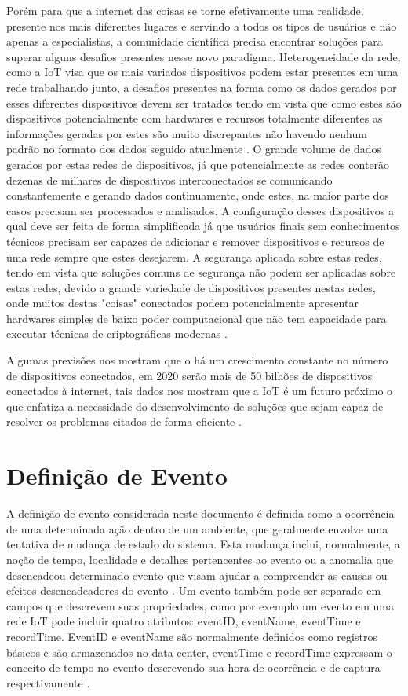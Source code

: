 \documentclass[ti,table]{texufpel} %
\begin{document}
Porém para que a internet das coisas se torne efetivamente uma realidade, presente nos mais diferentes lugares e servindo a todos os tipos de usuários e não apenas a especialistas, a comunidade científica precisa encontrar soluções para superar alguns desafios presentes nesse novo paradigma. Heterogeneidade da rede, como a IoT visa que os mais variados dispositivos podem estar presentes em uma rede trabalhando junto, a desafios presentes na forma como os dados gerados por esses diferentes dispositivos devem ser tratados tendo em vista que como estes são dispositivos potencialmente com hardwares e recursos totalmente diferentes as informações geradas por estes são muito discrepantes não havendo nenhum padrão no formato dos dados seguido atualmente \cite{agrawal2013survey}. O grande volume de dados gerados por estas redes de dispositivos, já que potencialmente as redes conterão dezenas de milhares de dispositivos interconectados se comunicando constantemente e gerando dados continuamente, onde estes, na maior parte dos casos precisam ser processados e analisados. A configuração desses dispositivos a qual deve ser feita de forma simplificada já que usuários finais sem conhecimentos técnicos precisam ser capazes de adicionar e remover dispositivos e recursos de uma rede sempre que estes desejarem. A segurança aplicada sobre estas redes, tendo em vista que soluções comuns de segurança não podem ser aplicadas sobre estas redes,  devido a grande variedade de dispositivos presentes nestas redes, onde muitos destas "coisas" conectados podem potencialmente apresentar hardwares simples de baixo poder computacional que não tem capacidade para executar técnicas de criptográficas modernas \cite{agrawal2013survey}.


Algumas previsões nos mostram que o há um crescimento constante no número de dispositivos conectados, em 2020 serão mais de 50 bilhões de dispositivos conectados à internet, tais dados nos mostram que a IoT é um futuro próximo o que enfatiza a necessidade do desenvolvimento de soluções que sejam capaz de resolver os problemas citados de forma eficiente \cite{xavier2016smart}.

\section{Definição de Evento}
A definição de evento considerada neste documento é definida como a ocorrência de uma determinada ação dentro de um ambiente, que geralmente envolve uma tentativa de mudança de estado do sistema. Esta mudança inclui, normalmente, a noção de tempo, localidade e detalhes pertencentes ao evento ou a anomalia que desencadeou determinado evento que visam ajudar a compreender as causas ou efeitos desencadeadores do evento \cite{fitzgerald2010common}.
Um evento também pode ser separado em campos que descrevem suas propriedades, como por exemplo um evento em uma rede IoT pode incluir quatro atributos: eventID, eventName, eventTime e recordTime. EventID e eventName são normalmente definidos como registros básicos e são armazenados no data center, eventTime e recordTime expressam o conceito de tempo no evento descrevendo sua hora de ocorrência e de captura respectivamente \cite{minbo2013information}. 
\end{document}
